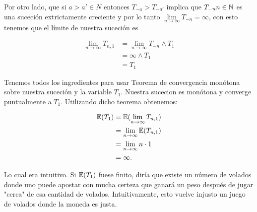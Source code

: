 	Por otro lado, que si $a>a' \in N$ entonces $T_{-a} > T_{-a'}$ implica que $T_{-n} n \in \mathbb{N}$ es 
	una suceción extrictamente creciente y por lo tanto 
	$\lim\limits_{n \rightarrow \infty} T_{-n} = \infty$, con esto tenemos que el límite de nuestra 
	suceción es 
	
    \begin{align}		
        \lim_{n\rightarrow\infty} T_{n,1}   &=  \lim_{n\rightarrow\infty} T_{-n} \wedge T_1 \\
                                            &=  \infty \wedge T_1                           \\
                                            &=  T_1
	\end{align}\pn

	Tenemos todos los ingredientes para usar Teorema de convergencia monótona sobre nuestra suceción
	y la variable $T_1$. Nuestra sucecion es monótona y converge puntualmente a $T_1$. Utilizando
	dicho teorema obtenemos:
	
	\begin{align}
        \mathbb{E}(T_1)     &=  \mathbb{E}(\lim_{n\rightarrow\infty} T_{n,1})       \\
                    &=  \lim_{n\rightarrow\infty} \mathbb{E}(T_{n,1})       \\
                    &=  \lim_{n\rightarrow\infty} n\cdot 1          \\
                    &=  \infty.
	\end{align}\pn
	
	Lo cual era intuitivo. Si $\mathbb{E}(T_1)$ fuese finito, diría que existe un número de volados donde
	uno puede apostar con mucha certeza que ganará un peso después de jugar "cerca" de esa cantidad
	de volados. Intuitivamente, esto vuelve injusto un juego de volados donde la moneda es
	justa.	